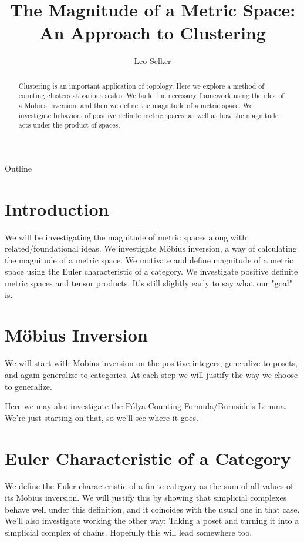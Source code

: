 \documentclass[12pt]{pom_thesis}
\author{Leo Selker}
\title{The Magnitude of a Metric Space: An Approach to Clustering}
\begin{document}
\maketitle

\begin{abstract}Clustering is an important application of topology. Here we explore a method of counting clusters at various scales. We build the necessary framework using the idea of a M\"obius inversion, and then we define the magnitude of a metric space\cite{Lein2}. We investigate behaviors of positive definite metric spaces, as well as how the magnitude acts under the product of spaces.
\end{abstract}

\tableofcontents

\newpage
{}
\begin{chapter}{Outline}
\section{Introduction}
We will be investigating the magnitude of metric spaces along with related/foundational ideas. We investigate M\"obius inversion, a way of calculating the magnitude of a metric space. We motivate and define magnitude of a metric space using the Euler characteristic of a category. We investigate positive definite metric spaces and tensor products. It's still slightly early to say what our "goal" is.
\section{M\"obius Inversion}
We will start with Mobius inversion on the positive integers, generalize to posets, and again generalize to categories\cite{Lein1}. At each step we will justify the way we choose to generalize.

Here we may also investigate the P\'olya Counting Formula/Burnside's Lemma. We're just starting on that, so we'll see where it goes.
\section{Euler Characteristic of a Category}
We define the Euler characteristic of a finite category as the sum of all values of its Mobius inversion\cite{Lein1}. We will justify this by showing that simplicial complexes behave well under this definition, and it coincides with the usual one in that case. We'll also investigate working the other way: Taking a poset and turning it into a simplicial complex of chains. Hopefully this will lead somewhere too.

\end{chapter}
\end{document}
